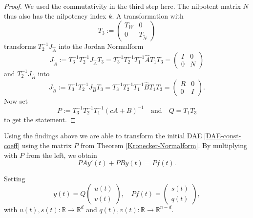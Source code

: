 \begin{proof}
	We used the commutativity in the third step here. The nilpotent matrix $N$ thus also has the nilpotency index $k$. A transformation with
	\begin{displaymath}
		T_3 := 
		\left(
		\begin{matrix}
			T_W & 0 \\
			0 & T_{\tilde{N}}
		\end{matrix}
		\right)
	\end{displaymath}
	transforms $T_2^{-1}J_{\hat{A}}$ into the Jordan Normalform
	\begin{displaymath}
		J_{\tilde{A}} := T_3^{-1}T_2^{-1}J_{\hat{A}}T_3 = T_3^{-1}T_2^{-1}T_1^{-1}\hat{A}T_1T_3 = 
		\left(
		\begin{matrix}
			I & 0 \\
			0 & N
		\end{matrix}
		\right)
	\end{displaymath}
	and $T_2^{-1}J_{\hat{B}}$ into
	\begin{displaymath}
		J_{\tilde{B}} := T_3^{-1}T_2^{-1}J_{\hat{B}}T_3 = T_3^{-1}T_2^{-1}T_1^{-1}\hat{B}T_1T_3 = 
		\left(
		\begin{matrix}
			R & 0 \\
			0 & I
		\end{matrix}
		\right) .
	\end{displaymath}
	Now set
	\begin{displaymath}
		P:= T_3^{-1}T_2^{-1}T_1^{-1}(cA+B)^{-1} \quad \text{and} \quad Q = T_1T_3
	\end{displaymath}
	to get the statement.
\end{proof}

Using the findings above we are able to transform the initial DAE \eqref{DAE-const-coeff} using the matrix $P$ from Theorem \ref{Kronecker-Normalform}. By multiplying with $P$ from the left, we obtain
\begin{displaymath}
	P A y'(t) + P B y(t) = P f(t) .
\end{displaymath}

Setting
\begin{displaymath}
	y(t) = Q
	\left(
	\begin{matrix}
		u(t) \\
		v(t)
	\end{matrix}  
	\right) 
	, \quad
	Pf(t) = 
	\left(
	\begin{matrix}
		s(t) \\
		q(t)
	\end{matrix}
	\right),
\end{displaymath}
with $u(t),s(t) : \mathbb{R} \to \mathbb{R}^d$ and $q(t),v(t) : \mathbb{R} \to \mathbb{R}^{n-d}$.

